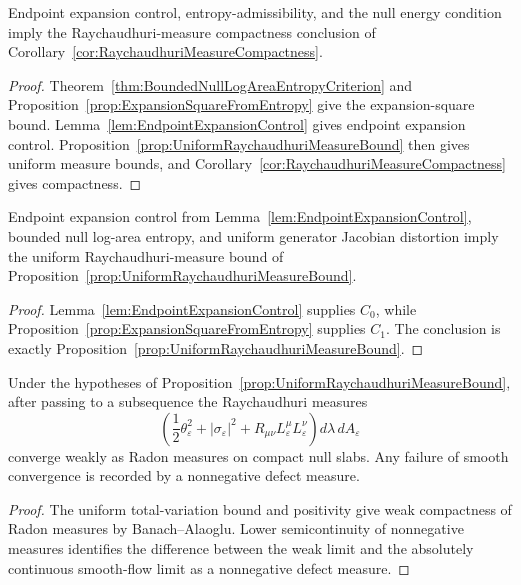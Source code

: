 \begin{corollary}\label{cor:EntropyRouteRaychaudhuriCompactness}
Endpoint expansion control, entropy-admissibility, and the null energy condition imply the Raychaudhuri-measure compactness conclusion of Corollary~\ref{cor:RaychaudhuriMeasureCompactness}.
\end{corollary}

\begin{proof}
Theorem~\ref{thm:BoundedNullLogAreaEntropyCriterion} and Proposition~\ref{prop:ExpansionSquareFromEntropy} give the expansion-square bound. Lemma~\ref{lem:EndpointExpansionControl} gives endpoint expansion control. Proposition~\ref{prop:UniformRaychaudhuriMeasureBound} then gives uniform measure bounds, and Corollary~\ref{cor:RaychaudhuriMeasureCompactness} gives compactness.
\end{proof}

\begin{corollary}\label{cor:RaychaudhuriFromEntropy}
Endpoint expansion control from Lemma~\ref{lem:EndpointExpansionControl}, bounded null log-area entropy, and uniform generator Jacobian distortion imply the uniform Raychaudhuri-measure bound of Proposition~\ref{prop:UniformRaychaudhuriMeasureBound}.
\end{corollary}

\begin{proof}
Lemma~\ref{lem:EndpointExpansionControl} supplies $C_0$, while Proposition~\ref{prop:ExpansionSquareFromEntropy} supplies $C_1$. The conclusion is exactly Proposition~\ref{prop:UniformRaychaudhuriMeasureBound}.
\end{proof}

\begin{corollary}\label{cor:RaychaudhuriMeasureCompactness}
Under the hypotheses of Proposition~\ref{prop:UniformRaychaudhuriMeasureBound}, after passing to a subsequence the Raychaudhuri measures
\[
    \left(
        \frac12\theta_\varepsilon^2
        +|\sigma_\varepsilon|^2
        +R_{\mu\nu}L_\varepsilon^\mu L_\varepsilon^\nu
    \right)d\lambda\,dA_\varepsilon
\]
converge weakly as Radon measures on compact null slabs. Any failure of smooth convergence is recorded by a nonnegative defect measure.
\end{corollary}

\begin{proof}
The uniform total-variation bound and positivity give weak compactness of Radon measures by Banach--Alaoglu. Lower semicontinuity of nonnegative measures identifies the difference between the weak limit and the absolutely continuous smooth-flow limit as a nonnegative defect measure.
\end{proof}

